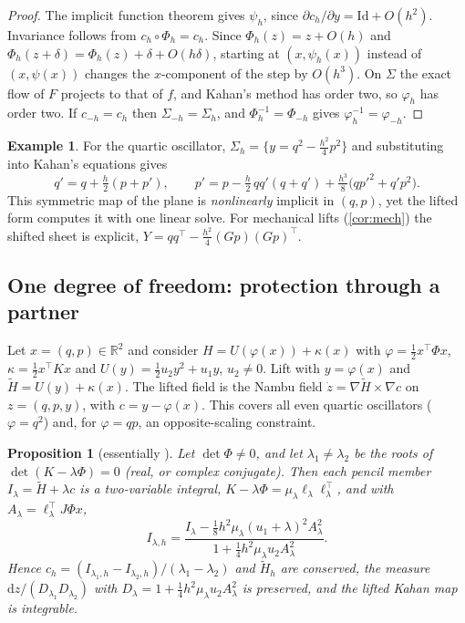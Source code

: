 \documentclass[11pt,a4paper]{article}
\newtheorem{proposition}[theorem]{Proposition}
\theoremstyle{definition}
\newtheorem{example}[theorem]{Example}
\theoremstyle{remark}
\newcommand{\R}{\mathbb{R}}
\newcommand{\Id}{\mathrm{Id}}
\newcommand{\dd}{\mathrm{d}}
\newcommand{\tr}{^{\!\top}}
\begin{document}
\begin{proof}
The implicit function theorem gives $\psi_h$, since $\partial c_h/\partial y=\Id+O(h^2)$. Invariance follows
from $c_h\circ\Phi_h=c_h$. Since $\Phi_h(z)=z+O(h)$ and $\Phi_h(z+\delta)=\Phi_h(z)+\delta+O(h\delta)$,
starting at $(x,\psi_h(x))$ instead of $(x,\psi(x))$ changes the $x$-component of the step by $O(h^3)$. On
$\Sigma$ the exact flow of $F$ projects to that of $f$, and Kahan's method has order two, so $\varphi_h$ has
order two. If $c_{-h}=c_h$ then $\Sigma_{-h}=\Sigma_h$, and $\Phi_h^{-1}=\Phi_{-h}$ gives
$\varphi_h^{-1}=\varphi_{-h}$.
\end{proof}

\begin{example}\label{ex:backsub}
For the quartic oscillator, $\Sigma_h=\{y=q^2-\frac{h^2}4p^2\}$ and substituting into Kahan's equations gives
\[
q'=q+\tfrac h2(p+p'),\qquad p'=p-\tfrac h2\,qq'(q+q')+\tfrac{h^3}{8}\big(qp'^2+q'p^2\big).
\]
This symmetric map of the plane is \emph{nonlinearly} implicit in $(q,p)$, yet the lifted form computes it
with one linear solve. For mechanical lifts (\cref{cor:mech}) the shifted sheet is explicit,
$Y=qq\tr-\frac{h^2}{4}(Gp)(Gp)\tr$.
\end{example}

\subsection{One degree of freedom: protection through a partner}

Let $x=(q,p)\in\R^2$ and consider $H=U(\varphi(x))+\kappa(x)$ with $\varphi=\frac12x\tr\Phi x$,
$\kappa=\frac12x\tr Kx$ and $U(y)=\frac12u_2y^2+u_1y$, $u_2\ne0$. Lift with $y=\varphi(x)$ and
$\tilde H=U(y)+\kappa(x)$. The lifted field is the Nambu field $\dot z=\nabla\tilde H\times\nabla c$ on
$z=(q,p,y)$, with $c=y-\varphi(x)$. This covers all even quartic oscillators ($\varphi=q^2$) and, for
$\varphi=qp$, an opposite-scaling constraint.

\begin{proposition}[essentially {\cite[Theorem~2]{CMOQ19}}]\label{prop:pencil}
Let $\det\Phi\ne0$, and let $\lambda_1\ne\lambda_2$ be the roots of $\det(K-\lambda\Phi)=0$ (real, or complex
conjugate). Then each pencil member $I_\lambda=\tilde H+\lambda c$ is a two-variable
integral, $K-\lambda\Phi=\mu_\lambda\ell_\lambda\ell_\lambda\tr$, and with $A_\lambda=\ell_\lambda\tr J\Phi x$,
\[
I_{\lambda,h}=\frac{I_\lambda-\frac18h^2\mu_\lambda(u_1+\lambda)^2A_\lambda^2}{1+\frac14h^2\mu_\lambda u_2A_\lambda^2}.
\]
Hence $c_h=(I_{\lambda_1,h}-I_{\lambda_2,h})/(\lambda_1-\lambda_2)$ and $\tilde H_h$ are conserved, the measure
$\dd z/(D_{\lambda_1}D_{\lambda_2})$ with $D_\lambda=1+\frac14h^2\mu_\lambda u_2A_\lambda^2$ is preserved, and
the lifted Kahan map is integrable.
\end{proposition}
\end{document}
